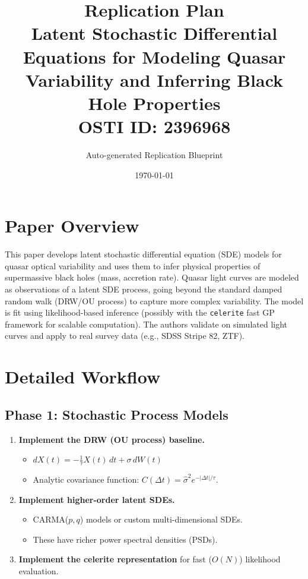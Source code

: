 \documentclass[11pt,a4paper]{article}
\title{\textbf{Replication Plan}\\[0.5em]
\large Latent Stochastic Differential Equations for Modeling Quasar Variability and Inferring Black Hole Properties\\[0.3em]
\normalsize OSTI ID: 2396968}
\author{Auto-generated Replication Blueprint}
\date{\today}
\begin{document}
\maketitle
\tableofcontents
\newpage

\section{Paper Overview}
This paper develops latent stochastic differential equation (SDE) models for quasar optical variability and uses them to infer physical properties of supermassive black holes (mass, accretion rate). Quasar light curves are modeled as observations of a latent SDE process, going beyond the standard damped random walk (DRW/OU process) to capture more complex variability. The model is fit using likelihood-based inference (possibly with the \texttt{celerite} fast GP framework for scalable computation). The authors validate on simulated light curves and apply to real survey data (e.g., SDSS Stripe 82, ZTF).

\section{Detailed Workflow}

\subsection{Phase 1: Stochastic Process Models}
\begin{enumerate}[label=\textbf{1.\arabic*}]
  \item \textbf{Implement the DRW (OU process) baseline.}
    \begin{itemize}
      \item $dX(t) = -\frac{1}{\tau} X(t)\,dt + \sigma\,dW(t)$
      \item Analytic covariance function: $C(\Delta t) = \hat{\sigma}^2 e^{-|\Delta t|/\tau}$.
    \end{itemize}
  \item \textbf{Implement higher-order latent SDEs.}
    \begin{itemize}
      \item CARMA($p,q$) models or custom multi-dimensional SDEs.
      \item These have richer power spectral densities (PSDs).
    \end{itemize}
  \item \textbf{Implement the celerite representation} for fast ($O(N)$) likelihood evaluation.
\end{enumerate}
\end{document}
